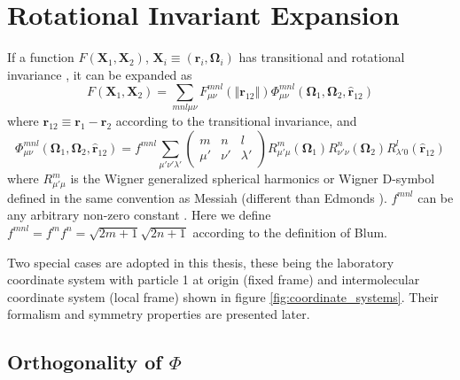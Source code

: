 
\chapter{Rotational Invariant Expansion\label{chpt:rotational-invariant-expansion}}

If a function $F(\mathbf{X}_{1},\mathbf{X}_{2})$, $\mathbf{X}_{i}\equiv(\mathbf{r}_{i},\mathbf{\Omega}_{i})$
has transitional and rotational invariance \citep{Blum_I}, it can
be expanded as
\begin{equation}
F(\mathbf{X}_{1},\mathbf{X}_{2})=\sum_{mnl\mu\nu}F_{\mu\nu}^{mnl}(\left\Vert \mathbf{r}_{12}\right\Vert )\Phi_{\mu\nu}^{mnl}(\mathbf{\Omega}_{1},\mathbf{\Omega}_{2},\mathbf{\hat{r}}_{12})\label{eq:pdf_on_rot_invar}
\end{equation}
where $\mathbf{r}_{12}\equiv\mathbf{r}_{1}-\mathbf{r}_{2}$ according
to the transitional invariance, and
\begin{equation}
\Phi_{\mu\nu}^{mnl}(\mathbf{\Omega}_{1},\mathbf{\Omega}_{2},\mathbf{\hat{r}}_{12})=f^{mnl}\sum_{\mu'\nu'\lambda'}\left(\begin{array}{ccc}
m & n & l\\
\mu' & \nu' & \lambda'
\end{array}\right)R_{\mu'\mu}^{m}(\mathbf{\Omega}_{1})R_{\nu'\nu}^{n}(\mathbf{\Omega}_{2})R_{\lambda'0}^{l}(\mathbf{\hat{r}}_{12})\label{eq:definition_rot_invar}
\end{equation}
where $R_{\mu'\mu}^{m}$ is the Wigner generalized spherical harmonics
or Wigner D-symbol defined in the same convention as Messiah \citep{Messiah}
(different than Edmonds \citep{Edmonds}). $f^{mnl}$ can be any arbitrary
non-zero constant \citep{Fries_Patey_1985}. Here we define $f^{mnl}=f^{m}f^{n}=\sqrt{2m+1}\sqrt{2n+1}$
according to the definition of Blum.

Two special cases are adopted in this thesis, these being the laboratory
coordinate system with particle 1 at origin (fixed frame) and intermolecular
coordinate system (local frame) shown in figure \ref{fig:coordinate_systems}.
Their formalism and symmetry properties are presented later.

\section{Orthogonality of $\Phi$}

